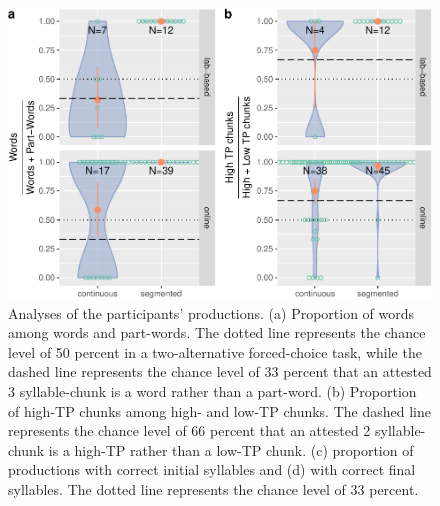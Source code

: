 \documentclass[
]{article}
\begin{document}
\begin{figure}

{\centering \includegraphics[width=0.8\linewidth]{segmentation_recall_combined_for_revision4_files/figure-latex/recall-w-pw-chunks-positions-plot-wpw-chunks-1} 

}

\caption{Analyses of the participants' productions. (a) Proportion of words among words and part-words. The dotted line represents the chance level of 50 percent in a two-alternative forced-choice task, while the dashed line represents the chance level of 33 percent that an attested 3 syllable-chunk is a word rather than a part-word. (b) Proportion of high-TP chunks among high- and low-TP chunks. The dashed line represents the chance level of 66 percent that an attested 2 syllable-chunk is a high-TP rather than a low-TP chunk. (c) proportion of productions with correct initial syllables and (d) with correct final syllables. The dotted line represents the chance level of 33 percent.}\label{fig:recall-w-pw-chunks-positions-plot-wpw-chunks}
\end{figure}
\end{document}
